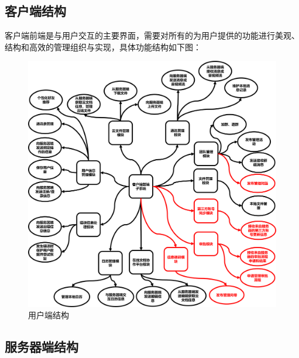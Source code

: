     \subsection{\color{red}客户端结构}
        客户端前端是与用户交互的主要界面，需要对所有的为用户提供的功能进行美观、
        结构和高效的管理组织与实现，具体功能结构如下图：
        \newpage
        \begin{figure}[h]
            \centering
            \includegraphics[scale=0.25]{OutlineDesign/figures/用户端结构new.png}
            \caption{\color{red}用户端结构}
            \label{fig:server_flow}
        \end{figure}
    \subsection{服务器端结构}
    
